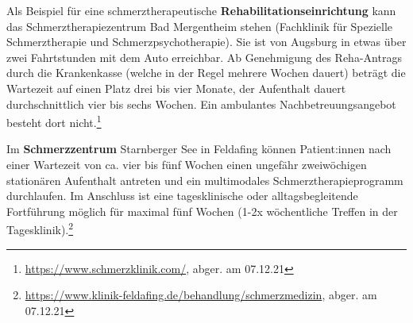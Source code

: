 \documentclass[
  twoside,
  parskip=half-,
]{scrreprt}
\begin{document}
Als Beispiel für eine schmerztherapeutische \textbf{Rehabilitationseinrichtung} kann das Schmerztherapiezentrum Bad Mergentheim stehen (Fachklinik für Spezielle Schmerztherapie und Schmerzpsychotherapie). Sie ist von Augsburg in etwas über zwei Fahrtstunden mit dem Auto erreichbar. Ab Genehmigung des Reha-Antrags durch die Krankenkasse (welche in der Regel mehrere Wochen dauert) beträgt die Wartezeit auf einen Platz drei bis vier Monate, der Aufenthalt dauert durchschnittlich vier bis sechs Wochen. Ein ambulantes Nachbetreuungsangebot besteht dort nicht.\footnote{\url{https://www.schmerzklinik.com/}, abger. am 07.12.21}

Im \textbf{Schmerzzentrum} Starnberger See in Feldafing können Patient:innen nach einer Wartezeit von ca. vier bis fünf Wochen einen ungefähr zweiwöchigen stationären Aufenthalt antreten und ein multimodales Schmerztherapieprogramm durchlaufen. Im Anschluss ist eine tagesklinische oder alltagsbegleitende Fortführung möglich für maximal fünf Wochen (1-2x wöchentliche Treffen in der Tagesklinik).\footnote{\url{https://www.klinik-feldafing.de/behandlung/schmerzmedizin}, abger. am 07.12.21}
\end{document}
